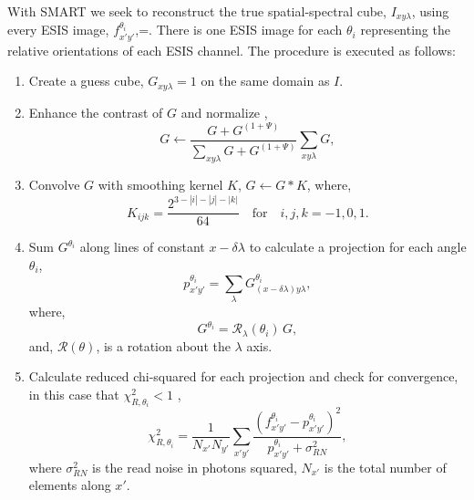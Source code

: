     	With SMART we seek to reconstruct the true spatial-spectral cube, $I_{xy\lambda}$, using every ESIS image, $f^{\theta_i}_{x'y'}$,=. There is one ESIS image for each $\theta_i$ representing the relative orientations of each ESIS channel. The procedure is executed as follows:
    	\begin{enumerate}
    		\item \label{step:guess} Create a guess cube, $G_{xy\lambda} = 1$ on the same domain as $I$. 
    		\item \label{step:contrast} Enhance the contrast of $G$ and normalize , 
    			\begin{equation}
	    				G \leftarrow \frac{G+G^{(1+\Psi)}}{\sum_{xy\lambda}G+G^{(1+\Psi)}}\sum_{xy\lambda}G, 
    			\end{equation}
    		 	
    		\item \label{step:smooth} Convolve $G$ with smoothing kernel $K$, $G \leftarrow G * K$,
    		where,
		   		\begin{equation}
	    			\label{eq:kernel}
	    			K_{ijk} = \frac{2^{3-|i|-|j|-|k|}}{64} \quad \text{for}\quad i,j,k = -1,0,1.
    			\end{equation}
    		
    		\item \label{step:project} Sum $G^{\theta_i}$ along lines of constant $x-\delta\lambda$ to calculate a projection for each angle $\theta_i$,
    			\begin{equation}
	    			p^{\theta_i}_{x'y'} = \sum_\lambda G^{\theta_i}_{(x-\delta\lambda)y\lambda}, 
    			\end{equation}
    		where,
    			\begin{equation}
	    			G^{\theta_i} = \mathcal{R}_\lambda(\theta_i)\,G,
    			\end{equation} 
    		and, $\mathcal{R}(\theta)$, is a rotation about the $\lambda$ axis. 	
    			
    		\item \label{step:chisquared} Calculate reduced chi-squared for each projection and check for convergence, in this case that $\chi_{R,\theta_i}^2 < 1$ , 
	    		\begin{equation}
	    			\chi_{R,\theta_i}^2 = \frac{1}{N_{x'} N_{y'}}\sum_{x'y'} \frac{(f^{\theta_i}_{x'y'}-p^{\theta_i}_{x'y'})^2}{p^{\theta_i}_{x'y'}+\sigma^2_{RN}},
	    		\end{equation}
	    	where $\sigma^2_{RN}$ is the read noise in photons squared, $N_{x'}$ is the total number of elements along $x'$.
    		

\end{enumerate}
